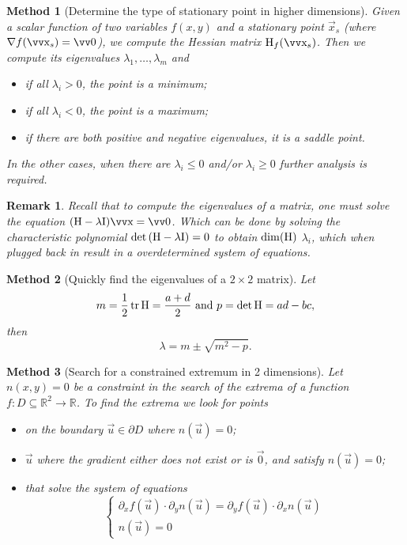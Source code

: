 \documentclass[twocolumn, margin=normal]{tex/hsrzf}
\theoremstyle{fuvarzf}
\newtheorem{method}{Method}
\newtheorem{remark}{Remark}
\DeclareMathOperator{\tr}{\mathrm{tr}}
\begin{document}
\begin{method}[Determine the type of stationary point in higher dimensions]
  Given a scalar function of two variables \(f(x,y)\) and a stationary point
  \(\vec{x}_s\) (where \(\grad f(\vec{x}_s) = \vec{0}\)), we compute the
  Hessian matrix \(\mtx{H}_f(\vec{x}_s)\). Then we compute its eigenvalues
  \(\lambda_1, \ldots, \lambda_m\) and
  \begin{itemize}
    \item if all \(\lambda_i > 0\), the point is a minimum;
    \item if all \(\lambda_i < 0\), the point is a maximum;
    \item if there are both positive and negative eigenvalues,
      it is a saddle point.
  \end{itemize}
  In the other cases, when there are \(\lambda_i \leq 0\) and/or \(\lambda_i
  \geq 0\) further analysis is required.
\end{method}

\begin{remark}
  Recall that to compute the eigenvalues of a matrix, one must solve the
  equation \((\mtx{H} - \lambda\mtx{I})\vec{x} = \vec{0}\). Which can be done
  by solving the characteristic polynomial \(\det\left(\mathrm{H} -
  \lambda\mathrm{I}\right) = 0\) to obtain \(\dim(\mathrm{H})\) \(\lambda_i\), which
  when plugged back in result in a overdetermined system of equations.
\end{remark}

\begin{method}[Quickly find the eigenvalues of a \(2\times 2\) matrix]
  Let
  \[
    m = \frac{1}{2}\tr \mtx{H} = \frac{a + d}{2}
    \text{  and  }
    p = \det\mtx{H} = ad - bc ,
  \]
  then
  \[
    \lambda = m \pm \sqrt{m^2 - p} .
  \]
\end{method}

\begin{method}[Search for a constrained extremum in 2 dimensions]
  Let \(n(x,y) = 0\) be a constraint in the search of the extrema of a function
  \(f: D \subseteq \mathbb{R}^2 \to \mathbb{R}\). To find the extrema we look for
  points
  \begin{itemize}
    \item on the boundary \(\vec{u} \in \partial D\) where \(n(\vec{u}) = 0\);

    \item \(\vec{u}\) where the gradient either does not exist or is
      \(\vec{0}\), and satisfy \(n(\vec{u}) = 0\);

    \item that solve the system of equations
      \[
        \begin{cases}
          \partial_x f(\vec{u}) \cdot \partial_y n(\vec{u})
            = \partial_y f(\vec{u}) \cdot \partial_x n(\vec{u}) \\
          n(\vec{u}) = 0
        \end{cases}
      \]
  \end{itemize}
\end{method}
\end{document}
